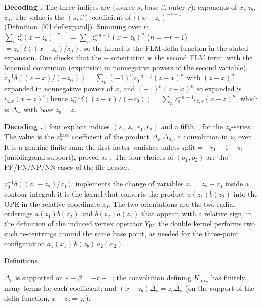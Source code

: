 \begin{dictionary}
\textbf{Decoding .} The three indices are (source $s$, base $\beta$, outer $r$): exponents of $x$, $z_b$, $z_o$.
The value is the $(s,\beta)$ coefficient of $\iota(x-z_b)^{-r-1}$ (Definition~\ref{l01:def:expand}). Summing over $r$:
$\sum_rz_o^{r}(x-z_b)^{-r-1} = \sum_nz_o^{-n-1}(x-z_b)^{n}$ ($n = -r-1$) $= z_o^{-1}\delta((x-z_b)/z_o)$, so the kernel is the
FLM delta function in the stated expansion. One checks that the $-$ orientation is the second FLM term: with the binomial
convention (expansion in nonnegative powers of the second variable),
$z_0^{-1}\delta((z-x)/(-z_0)) = \sum_n(-1)^nz_0^{-n-1}(z-x)^n$ with $(z-x)^n$ expanded in nonnegative powers of $x$, and
$(-1)^n(z-x)^n$ so expanded is $\iota_{z,x}(x-z)^n$; hence $z_0^{-1}\delta((z-x)/(-z_0)) = \sum_nz_0^{-n-1}\iota_{z,x}(x-z)^n$, which
is $\Delta_-$ with base $z_b = z$.

\textbf{Decoding .} : four explicit indices
$(s_1,s_2,r_1,r_2)$ and a fifth, , for the $z_b$-series. The value is the $z_b^{\text{base}}$ coefficient of the product
$\Delta_{o_1}\Delta_{o_2}$, a convolution in $z_b$ over . It is a genuine finite sum: the first factor vanishes
unless $\text{split} = -r_1-1-s_1$ (antidiagonal support), proved as . The four
choices of $(o_1,o_2)$ are the PP/PN/NP/NN cases of the file header.
\end{dictionary}

\begin{physics}
$z_0^{-1}\delta((z_1-z_2)/z_0)$ implements the change of variables $z_1 = z_2+z_0$ inside a contour integral: it is the
kernel that converts the product $a(z_1)b(z_2)$ into the OPE in the relative coordinate $z_0$. The two orientations
are the two radial orderings $a(z_1)b(z_2)$ and $b(z_2)a(z_1)$ that appear, with a relative sign, in the definition of
the induced vertex operator $Y_W$; the double kernel performs two such re-centrings around the same base point,
as needed for the three-point configuration $a_1(x_1)\,b(z_b)\,a_2(x_2)$.
\end{physics}

\begin{status}
Definitions.
\end{status}

\begin{proposition}\label{l01:prop:singledelta}
$\Delta_o$ is supported on $s+\beta = -r-1$; the convolution defining $K_{o_1o_2}$ has finitely many terms for each
coefficient; and $(x-z_b)\Delta_o = z_o\Delta_o$ (on the support of the delta function, $x-z_b = z_o$).
\end{proposition}

